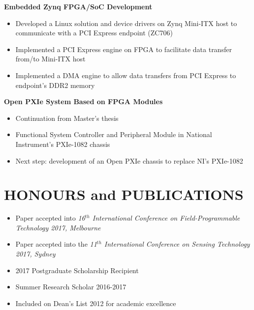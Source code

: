 \documentclass{res}
\begin{document}
\begin{resume}
  {\bf Embedded Zynq FPGA/SoC Development}
    \begin{itemize}[noitemsep] %
      \item Developed a Linux solution and device drivers on Zynq Mini-ITX 
      host to communicate with a PCI Express endpoint (ZC706)
      \item Implemented a PCI Express engine on FPGA to facilitate data transfer 
            from/to Mini-ITX host
      \item Implemented a DMA engine to allow data transfers from PCI Express 
            to endpoint's DDR2 memory
    \end{itemize}

 {\bf Open PXIe System Based on FPGA Modules}
    \begin{itemize}[noitemsep] %
      \item Continuation from Master's thesis
      \item Functional System Controller and Peripheral Module in National Instrument's PXIe-1082 chassis
      \item Next step: development of an Open PXIe chassis to replace NI's PXIe-1082
    \end{itemize}

\section{HONOURS and PUBLICATIONS}
\begin{itemize}[noitemsep]
  \item Paper accepted into \textit{16$^{th}$ International Conference on Field-Programmable Technology 2017, Melbourne}
  \item Paper accepted into the \textit{11$^{th}$ International Conference on Sensing Technology 2017, Sydney}
  \item 2017 Postgraduate Scholarship Recipient
  \item Summer Research Scholar 2016-2017
  \item Included on Dean's List 2012 for academic excellence
  \end{itemize}

\end{resume}
\end{document}

